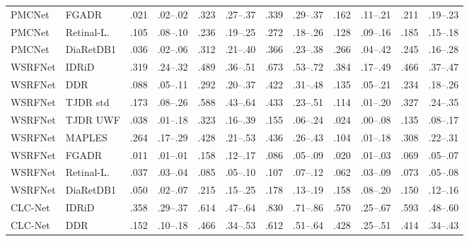 \begin{landscape}
{\begin{longtable}{l l c c c c c c c c c c}
PMCNet & FGADR & .021 & \scriptsize .02--.02 & .323 & \scriptsize .27--.37 & .339 & \scriptsize .29--.37 & .162 & \scriptsize .11--.21 & .211 & \scriptsize .19--.23 \\
PMCNet & Retinal-L. & .105 & \scriptsize .08--.10 & .236 & \scriptsize .19--.25 & .272 & \scriptsize .18--.26 & .128 & \scriptsize .09--.16 & .185 & \scriptsize .15--.18 \\
PMCNet & DiaRetDB1 & .036 & \scriptsize .02--.06 & .312 & \scriptsize .21--.40 & .366 & \scriptsize .23--.38 & .266 & \scriptsize .04--.42 & .245 & \scriptsize .16--.28 \\
WSRFNet & IDRiD & .319 & \scriptsize .24--.32 & .489 & \scriptsize .36--.51 & .673 & \scriptsize .53--.72 & .384 & \scriptsize .17--.49 & .466 & \scriptsize .37--.47 \\
WSRFNet & DDR & .088 & \scriptsize .05--.11 & .292 & \scriptsize .20--.37 & .422 & \scriptsize .31--.48 & .135 & \scriptsize .05--.21 & .234 & \scriptsize .18--.26 \\
WSRFNet & TJDR std & .173 & \scriptsize .08--.26 & .588 & \scriptsize .43--.64 & .433 & \scriptsize .23--.51 & .114 & \scriptsize .01--.20 & .327 & \scriptsize .24--.35 \\
WSRFNet & TJDR UWF & .038 & \scriptsize .01--.18 & .323 & \scriptsize .16--.39 & .155 & \scriptsize .06--.24 & .024 & \scriptsize .00--.08 & .135 & \scriptsize .08--.17 \\
WSRFNet & MAPLES & .264 & \scriptsize .17--.29 & .428 & \scriptsize .21--.53 & .436 & \scriptsize .26--.43 & .104 & \scriptsize .01--.18 & .308 & \scriptsize .22--.31 \\
WSRFNet & FGADR & .011 & \scriptsize .01--.01 & .158 & \scriptsize .12--.17 & .086 & \scriptsize .05--.09 & .020 & \scriptsize .01--.03 & .069 & \scriptsize .05--.07 \\
WSRFNet & Retinal-L. & .037 & \scriptsize .03--.04 & .085 & \scriptsize .05--.10 & .107 & \scriptsize .07--.12 & .062 & \scriptsize .03--.09 & .073 & \scriptsize .05--.08 \\
WSRFNet & DiaRetDB1 & .050 & \scriptsize .02--.07 & .215 & \scriptsize .15--.25 & .178 & \scriptsize .13--.19 & .158 & \scriptsize .08--.20 & .150 & \scriptsize .12--.16 \\
CLC-Net & IDRiD & .358 & \scriptsize .29--.37 & .614 & \scriptsize .47--.64 & .830 & \scriptsize .71--.86 & .570 & \scriptsize .25--.67 & .593 & \scriptsize .48--.60 \\
CLC-Net & DDR & .152 & \scriptsize .10--.18 & .466 & \scriptsize .34--.53 & .612 & \scriptsize .51--.64 & .428 & \scriptsize .25--.51 & .414 & \scriptsize .34--.43 \\

\end{longtable}}
\end{landscape}
